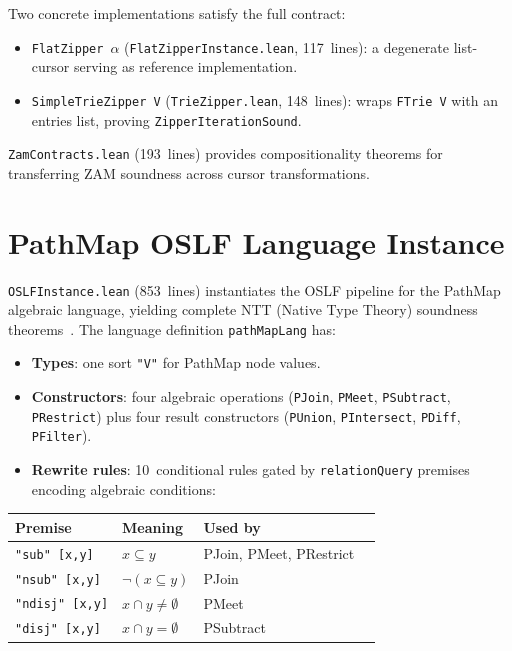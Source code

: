 \documentclass[11pt]{article}
\theoremstyle{definition}
\theoremstyle{remark}
\newcommand{\PathMap}{\textup{PathMap}}
\begin{document}
Two concrete implementations satisfy the full contract:
\begin{itemize}[nosep]
  \item \texttt{FlatZipper}~$\alpha$ (\texttt{FlatZipperInstance.lean},
        117~lines): a degenerate list-cursor serving as reference implementation.
  \item \texttt{SimpleTrieZipper V} (\texttt{TrieZipper.lean}, 148~lines):
        wraps \texttt{FTrie V} with an entries list, proving
        \texttt{ZipperIterationSound}.
\end{itemize}

\noindent
\texttt{ZamContracts.lean} (193~lines) provides compositionality theorems
for transferring ZAM soundness across cursor transformations.

\section{PathMap OSLF Language Instance}
\label{sec:oslf}

\texttt{OSLFInstance.lean} (853~lines) instantiates the OSLF pipeline for
the \PathMap{} algebraic language, yielding complete NTT (Native Type Theory)
soundness theorems~\cite{WilliamsStayNTT2021}.
The language definition \texttt{pathMapLang} has:
\begin{itemize}[nosep]
  \item \textbf{Types}: one sort \texttt{"V"} for \PathMap{} node values.
  \item \textbf{Constructors}: four algebraic operations (\texttt{PJoin},
        \texttt{PMeet}, \texttt{PSubtract}, \texttt{PRestrict}) plus four
        result constructors (\texttt{PUnion}, \texttt{PIntersect},
        \texttt{PDiff}, \texttt{PFilter}).
  \item \textbf{Rewrite rules}: 10~conditional rules gated by
        \texttt{relationQuery} premises encoding algebraic conditions:
\end{itemize}

\begin{center}
\begin{tabular}{@{}llll@{}}
\toprule
\textbf{Premise} & \textbf{Meaning} & \textbf{Used by} \\
\midrule
\texttt{"sub" [x,y]}   & $x \subseteq y$          & PJoin, PMeet, PRestrict \\
\texttt{"nsub" [x,y]}  & $\neg(x \subseteq y)$    & PJoin \\
\texttt{"ndisj" [x,y]} & $x \cap y \neq \emptyset$ & PMeet \\
\texttt{"disj" [x,y]}  & $x \cap y = \emptyset$    & PSubtract \\
\bottomrule
\end{tabular}
\end{center}
\end{document}

